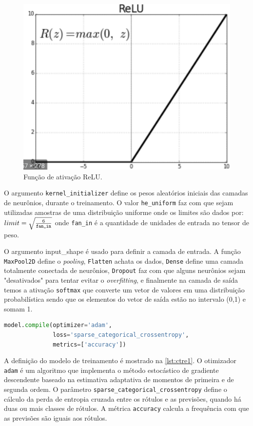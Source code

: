 \documentclass[sigconf, nonacm, screen]{acmart}
\begin{document}
\begin{figure}[ht]
	\centering
	\includegraphics[width=0.6\linewidth]{img/relu}
	\caption{Função de ativação ReLU.}
	\label{fig:relu}
\end{figure}

O argumento \texttt{kernel\_initializer} define os pesos aleatórios iniciais das camadas de neurônios, durante o treinamento. O valor \texttt{he\_uniform} faz com que sejam utilizadas amostras de uma distribuição uniforme onde os limites são dados por: $ limit = \sqrt{6 \over \texttt{fan\_in}} $ onde \texttt{fan\_in} é a quantidade de unidades de entrada no tensor de peso.

O argumento {input\_shape} é usado para definir a camada de entrada. A função \texttt{MaxPool2D} define o \textit{pooling}, \texttt{Flatten} achata os dados, \texttt{Dense} define uma camada totalmente conectada de neurônios, \texttt{Dropout} faz com que alguns neurônios sejam "desativados" para tentar evitar o \textit{overfitting}, e finalmente na camada de saída temos a ativação \texttt{softmax} que converte um vetor de valores em uma distribuição probabilística sendo que os elementos do vetor de saída estão no intervalo (0,1) e somam 1.

\begin{lstlisting}[language=Python,label=lst:ctre1,caption={Topologia 1 - configuração do modelo de treinamento}]
model.compile(optimizer='adam',
              loss='sparse_categorical_crossentropy',
              metrics=['accuracy'])
\end{lstlisting}

A definição do modelo de treinamento é mostrado na \autoref{lst:ctre1}. O otimizador \texttt{adam} é um algoritmo que implementa o método estocástico de gradiente descendente baseado na estimativa adaptativa de momentos de primeira e de segunda ordem. O parâmetro \texttt{sparse\_categorical\_crossentropy} define o cálculo da perda de entropia cruzada entre os rótulos e as previsões, quando há duas ou mais classes de rótulos. A métrica \texttt{accuracy} calcula a frequência com que as previsões são iguais aos rótulos.
\end{document}
